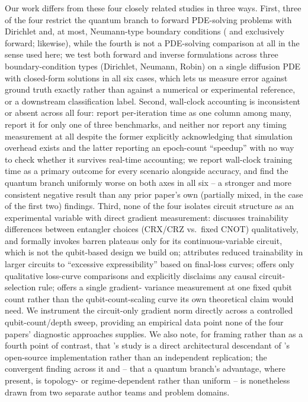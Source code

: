 Our work differs from these four closely related studies in three ways.
First, three of the four restrict the quantum branch to forward
PDE-solving problems with Dirichlet and, at most, Neumann-type boundary
conditions (\citealp{farea2025qcpinn} and \citealp{qcpinn2025reservoir}
exclusively forward; \citealp{hqpinn2025flow} likewise), while the fourth
\citep{hqcpinn2026hydro} is not a PDE-solving comparison at all in the
sense used here; we test both forward and inverse formulations across
three boundary-condition types (Dirichlet, Neumann, Robin) on a single
diffusion PDE with closed-form solutions in all six cases, which lets us
measure error against ground truth exactly rather than against a numerical
or experimental reference, or a downstream classification label. Second,
wall-clock accounting is inconsistent or absent across all four:
\citet{farea2025qcpinn} report per-iteration time as one column among many,
\citet{hqpinn2025flow} report it for only one of three benchmarks, and
neither \citet{qcpinn2025reservoir} nor \citet{hqcpinn2026hydro} report any
timing measurement at all despite the former explicitly acknowledging that
simulation overhead exists and the latter reporting an epoch-count
``speedup'' with no way to check whether it survives real-time accounting;
we report wall-clock training time as a primary outcome for every scenario
alongside accuracy, and find the quantum branch uniformly worse on both
axes in all six -- a stronger and more consistent negative result than any
prior paper's own (partially mixed, in the case of the first two) findings.
Third, none of the four isolates circuit
structure as an experimental variable with direct gradient measurement:
\citet{farea2025qcpinn} discusses trainability differences between
entangler choices (CRX/CRZ vs.\ fixed CNOT) qualitatively, and formally
invokes barren plateaus only for its continuous-variable circuit, which is
not the qubit-based design we build on; \citet{hqpinn2025flow} attributes
reduced trainability in larger circuits to ``excessive expressibility''
based on final-loss curves; \citet{qcpinn2025reservoir} offers only
qualitative loss-curve comparisons and explicitly disclaims any causal
circuit-selection rule; \citet{hqcpinn2026hydro} offers a single gradient-
variance measurement at one fixed qubit count rather than the
qubit-count-scaling curve its own theoretical claim would need. We
instrument the circuit-only gradient norm directly across a controlled
qubit-count/depth sweep, providing an empirical data point none of the
four papers' diagnostic approaches supplies. We also note, for framing
rather than as a fourth point of contrast, that
\citeauthor{qcpinn2025reservoir}'s study is a direct architectural
descendant of \citeauthor{farea2025qcpinn}'s open-source implementation
rather than an independent replication; the convergent finding across it
and \citet{hqpinn2025flow} -- that a quantum branch's advantage, where
present, is topology- or regime-dependent rather than uniform -- is
nonetheless drawn from two separate author teams and problem domains.

